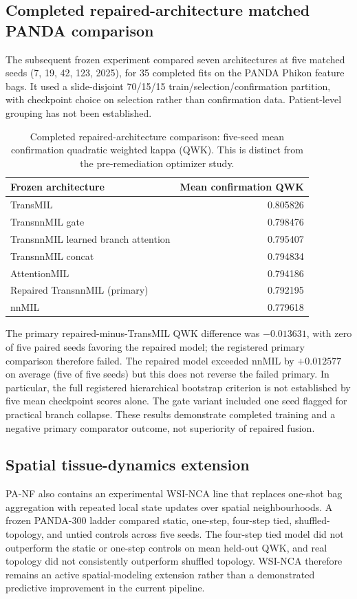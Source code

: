 \subsection{Completed repaired-architecture matched PANDA comparison}
The subsequent frozen experiment compared seven architectures at five matched seeds (7, 19, 42, 123, 2025), for 35 completed fits on the PANDA Phikon feature bags. It used a slide-disjoint 70/15/15 train/selection/confirmation partition, with checkpoint choice on selection rather than confirmation data. Patient-level grouping has not been established.

\begin{table}[t]
\centering
\caption{Completed repaired-architecture comparison: five-seed mean confirmation quadratic weighted kappa (QWK). This is distinct from the pre-remediation optimizer study.}
\label{tab:transnnmil_repaired_matched}
\small
\begin{tabular}{lr}
\toprule
Frozen architecture & Mean confirmation QWK \\
\midrule
TransMIL & 0.805826 \\
TransnnMIL gate & 0.798476 \\
TransnnMIL learned branch attention & 0.795407 \\
TransnnMIL concat & 0.794834 \\
AttentionMIL & 0.794186 \\
Repaired TransnnMIL (primary) & 0.792195 \\
nnMIL & 0.779618 \\
\bottomrule
\end{tabular}
\end{table}

The primary repaired-minus-TransMIL QWK difference was $-0.013631$, with zero of five paired seeds favoring the repaired model; the registered primary comparison therefore failed. The repaired model exceeded nnMIL by $+0.012577$ on average (five of five seeds) but this does not reverse the failed primary. In particular, the full registered hierarchical bootstrap criterion is not established by five mean checkpoint scores alone. The gate variant included one seed flagged for practical branch collapse. These results demonstrate completed training and a negative primary comparator outcome, not superiority of repaired fusion.

\subsection{Spatial tissue-dynamics extension}
PA-NF also contains an experimental WSI-NCA line that replaces one-shot bag aggregation with repeated local state updates over spatial neighbourhoods. A frozen PANDA-300 ladder compared static, one-step, four-step tied, shuffled-topology, and untied controls across five seeds. The four-step tied model did not outperform the static or one-step controls on mean held-out QWK, and real topology did not consistently outperform shuffled topology. WSI-NCA therefore remains an active spatial-modeling extension rather than a demonstrated predictive improvement in the current pipeline.
